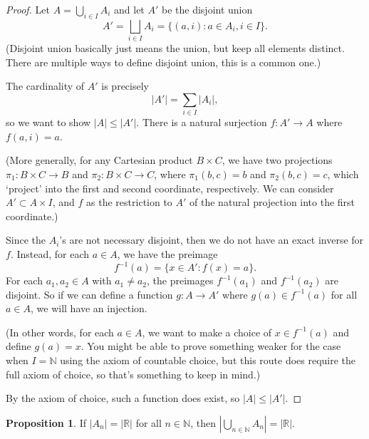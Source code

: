 \documentclass[12pt]{article}
\theoremstyle{definition}
\newtheorem{proposition}{Proposition}
\newcommand{\N}{\mathbb{N}}
\newcommand{\R}{\mathbb{R}}
\begin{document}
\begin{proof}
    Let $A = \bigcup_{i \in I} A_i$ and let $A'$ be the disjoint union
    \[
        A' = \bigsqcup_{i \in I} A_i = \{(a, i) : a \in A_i, i \in I\}.
    \]
    (Disjoint union basically just means the union, but keep all elements distinct. There are multiple ways to define disjoint union, this is a common one.)
    
    The cardinality of $A'$ is precisely
    \[
        |A'| = \sum_{i \in I} |A_i|,
    \]
    so we want to show $|A| \leq |A'|$. There is a natural surjection $f : A' \to A$ where $f(a, i) = a$.
    
    (More generally, for any Cartesian product $B \times C$, we have two projections $\pi_1 : B \times C \to B$ and $\pi_2 : B \times C \to C$, where $\pi_1(b, c) = b$ and $\pi_2(b, c) = c$, which `project' into the first and second coordinate, respectively. We can consider $A' \subset A \times I$, and $f$ as the restriction to $A'$ of the natural projection into the first coordinate.) 
    
    Since the $A_i$'s are not necessary disjoint, then we do not have an exact inverse for $f$. Instead, for each $a \in A$, we have the preimage
    \[
        f^{-1}(a) = \{x \in A' : f(x) = a\}.
    \]
    For each $a_1, a_2 \in A$ with $a_1 \ne a_2$, the preimages $f^{-1}(a_1)$ and $f^{-1}(a_2)$ are disjoint. So if we can define a function $g : A \to A'$ where $g(a) \in f^{-1}(a)$ for all $a \in A$, we will have an injection.
    
    (In other words, for each $a \in A$, we want to make a choice of $x \in f^{-1}(a)$ and define $g(a) = x$. You might be able to prove something weaker for the case when $I = \N$ using the axiom of countable choice, but this route does require the full axiom of choice, so that's something to keep in mind.)
    
    By the axiom of choice, such a function does exist, so $|A| \leq |A'|$.
    
\end{proof}

\newpage

\begin{proposition}
    If $|A_n| = |\R|$ for all $n \in \N$, then $\left|\bigcup_{n \in \N} A_n\right| = |\R|$. 
\end{proposition}
\end{document}
